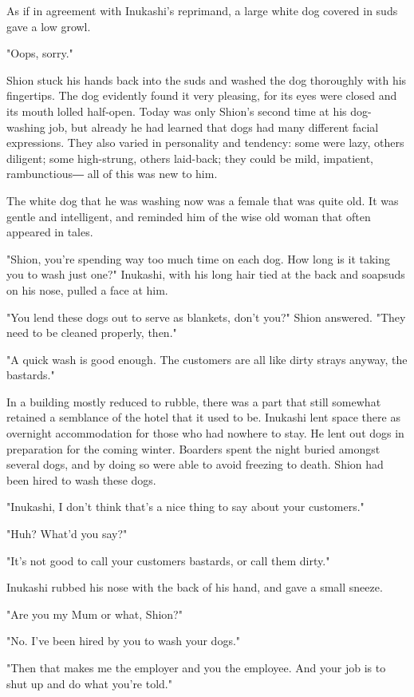 As if in agreement with Inukashi's reprimand, a large white dog covered
in suds gave a low growl.

"Oops, sorry."

Shion stuck his hands back into the suds and washed the dog thoroughly
with his fingertips. The dog evidently found it very pleasing, for its
eyes were closed and its mouth lolled half-open. Today was only Shion's
second time at his dog-washing job, but already he had learned that dogs
had many different facial expressions. They also varied in personality
and tendency: some were lazy, others diligent; some high-strung, others
laid-back; they could be mild, impatient, rambunctious― all of this was
new to him.

The white dog that he was washing now was a female that was quite old.
It was gentle and intelligent, and reminded him of the wise old woman
that often appeared in tales.

"Shion, you're spending way too much time on each dog. How long is it
taking you to wash just one?" Inukashi, with his long hair tied at the
back and soapsuds on his nose, pulled a face at him.

"You lend these dogs out to serve as blankets, don't you?" Shion
answered. "They need to be cleaned properly, then."

"A quick wash is good enough. The customers are all like dirty strays
anyway, the bastards."

In a building mostly reduced to rubble, there was a part that still
somewhat retained a semblance of the hotel that it used to be. Inukashi
lent space there as overnight accommodation for those who had nowhere to
stay. He lent out dogs in preparation for the coming winter. Boarders
spent the night buried amongst several dogs, and by doing so were able
to avoid freezing to death. Shion had been hired to wash these dogs.

"Inukashi, I don't think that's a nice thing to say about your
customers."

"Huh? What'd you say?"

"It's not good to call your customers bastards, or call them dirty."

Inukashi rubbed his nose with the back of his hand, and gave a small
sneeze.

"Are you my Mum or what, Shion?"

"No. I've been hired by you to wash your dogs."

"Then that makes me the employer and you the employee. And your job is
to shut up and do what you're told."

